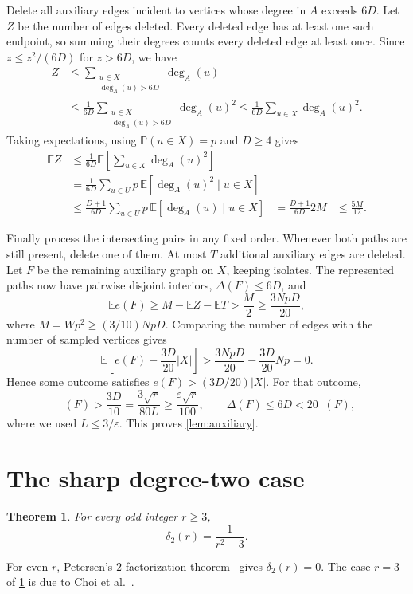 \documentclass[11pt]{amsart}
\newtheorem{theorem}{Theorem}[section]
\theoremstyle{remark}
\newcommand{\E}{\mathbb E}
\newcommand{\Prob}{\mathbb P}
\DeclareMathOperator{\avdeg}{\overline d}
\begin{document}
Delete all auxiliary edges incident to vertices whose degree in $A$ exceeds $6D$. Let $Z$ be the number of edges deleted. Every deleted edge has at least one such endpoint, so summing their degrees counts every deleted edge at least once. Since $z\le z^2/(6D)$ for $z>6D$, we have
\[
\begin{aligned}
Z
&\le\sum_{\substack{u\in X\\\deg_A(u)>6D}}\deg_A(u)\\
&\le\frac1{6D}\sum_{\substack{u\in X\\\deg_A(u)>6D}}\deg_A(u)^2
\le\frac1{6D}\sum_{u\in X}\deg_A(u)^2.
\end{aligned}
\]
Taking expectations, using $\Prob(u\in X)=p$ and $D \geq 4$ gives
\[
\begin{aligned}
\E Z
&\le\frac1{6D}\E\left[\sum_{u\in X}\deg_A(u)^2\right]\\
&=\frac1{6D}\sum_{u\in U}p\,\E[\deg_A(u)^2\mid u\in X]\\
&\le\frac{D+1}{6D}\sum_{u\in U}p\,\E[\deg_A(u)\mid u\in X]
&= \frac{D+1}{6D} 2M
&\leq\frac{5M}{12}.
\end{aligned}
\]


Finally process the intersecting pairs in any fixed order. Whenever both paths are still present, delete one of them. At most $T$ additional auxiliary edges are deleted. Let $F$ be the remaining auxiliary graph on $X$, keeping isolates. The represented paths now have pairwise disjoint interiors, $\Delta(F)\le6D$, and
\[
\E e(F)\ge M-\E Z-\E T>\frac M2\ge\frac{3NpD}{20},
\]
where $M=Wp^2\ge(3/10)NpD$. Comparing the number of edges with the number of sampled vertices gives
\[
\E\left[e(F)-\frac{3D}{20}|X|\right]
>\frac{3NpD}{20}-\frac{3D}{20}Np=0.
\]
Hence some outcome satisfies $e(F)>(3D/20)|X|$. For that outcome,
\[
\avdeg(F)>\frac{3D}{10}=\frac{3\sqrt r}{80L}
\ge\frac{\varepsilon\sqrt r}{100},
\qquad
\Delta(F)\le6D<20\avdeg(F),
\]
where we used $L\le3/\varepsilon$. This proves \cref{lem:auxiliary}.

\section{The sharp degree-two case}\label{sec:k2}

\begin{theorem}\label{thm:k2}
For every odd integer $r\ge3$,
\[
\delta_2(r)=\frac1{r^2-3}.
\]
\end{theorem}

For even $r$, Petersen's $2$-factorization theorem~\cite{Petersen1891} gives $\delta_2(r)=0$. The case $r=3$ of \cref{thm:k2} is due to Choi et al.~\cite{CKKPW2019}.
\end{document}
